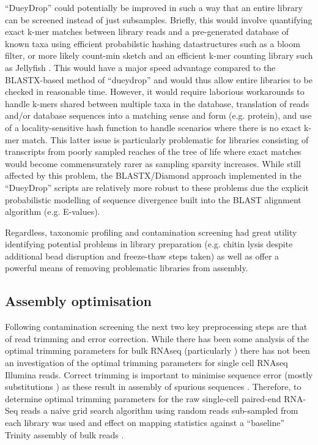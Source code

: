 ``DueyDrop'' could potentially be improved in such a way that an entire library can be screened instead of just subsamples.
Briefly, this would involve quantifying exact k-mer matches between library reads and a pre-generated database of known taxa
using efficient probabilstic hashing datastructures such as a bloom filter, or more likely count-min sketch and an efficient
k-mer counting library such as Jellyfish \citep{Marcais2011}.  This would have a major speed advantage compared to the BLASTX-based method of ``dueydrop''
and would thus allow entire libraries to be checked in reasonable time.  However, it would require laborious workarounds to handle
k-mers shared between multiple taxa in the database, translation of reads and/or database sequences into a matching sense and form (e.g. protein),
and use of a locality-sensitive hash function to handle scenarios where there is no exact k-mer match. This latter issue is particularly
problematic for libraries consisting of transcripts from poorly sampled reaches of the tree of life where exact matches would become
commensurately rarer as sampling sparsity increases.  
While still affected by this problem, the BLASTX/Diamond approach implemented in the ``DueyDrop'' scripts are relatively more robust to these
problems due the explicit probabilistic modelling of sequence divergence built into the BLAST alignment algorithm (e.g. E-values).

Regardless, taxonomic profiling and contamination screening had great utility identifying potential problems in library preparation (e.g. chitin lysis despite
additional bead disruption and freeze-thaw steps taken) as well as offer a powerful means of removing problematic libraries from assembly.






\subsection{Assembly optimisation}


Following contamination screening the next two key preprocessing steps are that of read trimming and error correction.
While there has been some analysis of the optimal trimming parameters for bulk RNAseq (particularly \citep{Macmanes2014})
there has not been an investigation of the optimal trimming parameters for single cell RNAseq Illumina reads.
Correct trimming is important to minimise sequence error (mostly substitutions \citep{Yang2013}) as these
result in assembly of spurious sequences \citep{Macmanes2013,Macmanes2014}.  Therefore, to determine
optimal trimming parameters for the raw single-cell paired-end RNA-Seq reads 
a naive grid search algorithm using random reads sub-sampled from each library was used and effect on mapping
statistics against a ``baseline'' Trinity assembly of bulk reads \citep{Haas2013}.

